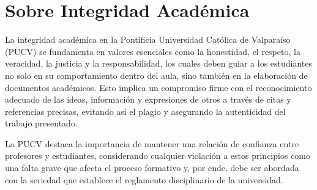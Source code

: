 \chapter{Sobre Integridad Académica}
La integridad académica en la Pontificia Universidad Católica de Valparaíso (PUCV) se fundamenta en valores esenciales como la honestidad, el respeto, la veracidad, la justicia y la responsabilidad, los cuales deben guiar a los estudiantes no solo en su comportamiento dentro del aula, sino también en la elaboración de documentos académicos. Esto implica un compromiso firme con el reconocimiento adecuado de las ideas, información y expresiones de otros a través de citas y referencias precisas, evitando así el plagio y asegurando la autenticidad del trabajo presentado.

La PUCV destaca la importancia de mantener una relación de confianza entre profesores y estudiantes, considerando cualquier violación a estos principios como una falta grave que afecta el proceso formativo y, por ende, debe ser abordada con la seriedad que establece el reglamento disciplinario de la universidad. 
